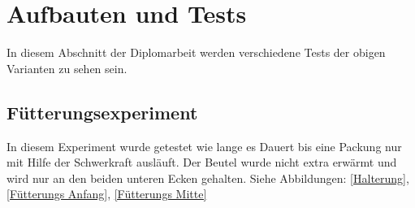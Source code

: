 \newpage
\section{Aufbauten und Tests}

In diesem Abschnitt der Diplomarbeit werden verschiedene Tests der obigen Varianten zu sehen sein. \\

\subsection{Fütterungsexperiment} 

In diesem Experiment wurde getestet wie lange es Dauert bis eine Packung nur mit Hilfe der Schwerkraft ausläuft. Der Beutel wurde nicht extra erwärmt und wird nur an den beiden unteren Ecken gehalten. Siehe Abbildungen: \ref{Halterung}, \ref{Fütterungs Anfang}, \ref{Fütterungs Mitte}

